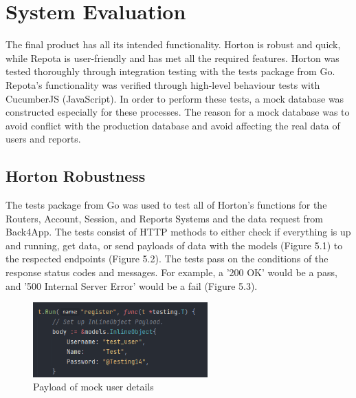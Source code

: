 \chapter{System Evaluation}
The final product has all its intended functionality. Horton is robust and quick, while Repota is user-friendly and has met all the required features. Horton was tested thoroughly through integration testing with the tests package from Go. Repota's functionality was verified through high-level behaviour tests with CucumberJS (JavaScript). In order to perform these tests, a mock database was constructed especially for these processes. The reason for a mock database was to avoid conflict with the production database and avoid affecting the real data of users and reports.

\section{Horton Robustness}
The tests package from Go was used to test all of Horton's functions for the Routers, Account, Session, and Reports Systems and the data request from Back4App. The tests consist of HTTP methods to either check if everything is up and running, get data, or send payloads of data with the models (Figure 5.1) to the respected endpoints (Figure 5.2). The tests pass on the conditions of the response status codes and messages. For example, a '200 OK' would be a pass, and '500 Internal Server Error' would be a fail (Figure 5.3).

\begin{figure}[H]
    \centering
    \caption{Payload of mock user details}
    \label{image:registertest}
    \includegraphics[width=0.6\textwidth]{images/horton/tests/register_test_payload.png}
\end{figure}

